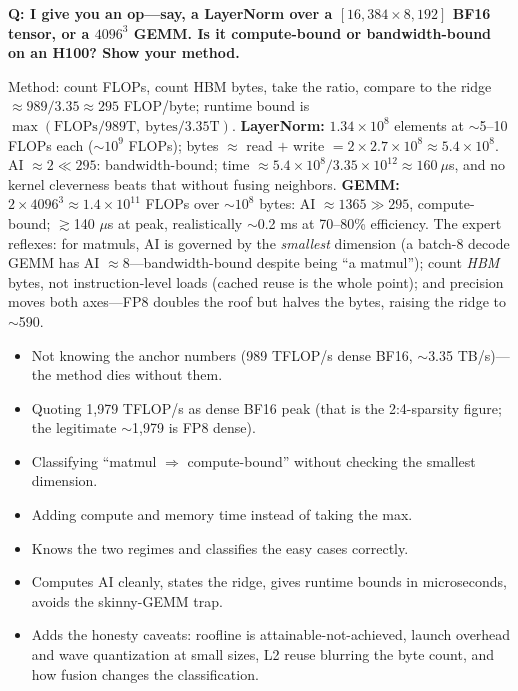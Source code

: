 \begin{interviewq}
\textbf{Q: I give you an op---say, a LayerNorm over a $[16{,}384 \times 8{,}192]$ BF16 tensor, or a $4096^3$ GEMM. Is it compute-bound or bandwidth-bound on an H100? Show your method.}

 \quad {} \quad \badgefreq{\freqhigh}

\stronganswer Method: count FLOPs, count HBM bytes, take the ratio, compare to the ridge $\approx 989/3.35 \approx 295$ FLOP/byte; runtime bound is $\max(\text{FLOPs}/989\text{T},\ \text{bytes}/3.35\text{T})$. \textbf{LayerNorm:} $1.34\times10^{8}$ elements at $\sim$5--10 FLOPs each ($\sim$$10^{9}$ FLOPs); bytes $\approx$ read $+$ write $= 2 \times 2.7\times10^{8} \approx 5.4\times10^{8}$. AI $\approx 2 \ll 295$: bandwidth-bound; time $\approx 5.4\times10^{8}/3.35\times10^{12} \approx 160\ \mu$s, and no kernel cleverness beats that without fusing neighbors. \textbf{GEMM:} $2 \times 4096^3 \approx 1.4\times10^{11}$ FLOPs over $\sim$$10^{8}$ bytes: AI $\approx 1365 \gg 295$, compute-bound; $\gtrsim$140 $\mu$s at peak, realistically $\sim$0.2 ms at 70--80\% efficiency. The expert reflexes: for matmuls, AI is governed by the \textit{smallest} dimension (a batch-8 decode GEMM has AI $\approx 8$---bandwidth-bound despite being ``a matmul''); count \textit{HBM} bytes, not instruction-level loads (cached reuse is the whole point); and precision moves both axes---FP8 doubles the roof but halves the bytes, raising the ridge to $\sim$590.

\redflags
\begin{itemize}
    \item Not knowing the anchor numbers (989 TFLOP/s dense BF16, $\sim$3.35 TB/s)---the method dies without them.
    \item Quoting 1{,}979 TFLOP/s as dense BF16 peak (that is the 2:4-sparsity figure; the legitimate $\sim$1{,}979 is FP8 dense).
    \item Classifying ``matmul $\Rightarrow$ compute-bound'' without checking the smallest dimension.
    \item Adding compute and memory time instead of taking the max.
\end{itemize}

\goodgreat
\begin{itemize}
    \item {} Knows the two regimes and classifies the easy cases correctly.
    \item {} Computes AI cleanly, states the ridge, gives runtime bounds in microseconds, avoids the skinny-GEMM trap.
    \item {} Adds the honesty caveats: roofline is attainable-not-achieved, launch overhead and wave quantization at small sizes, L2 reuse blurring the byte count, and how fusion changes the classification.
\end{itemize}


\end{interviewq}

